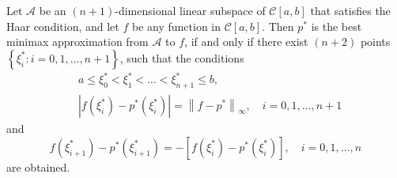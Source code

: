 \documentclass[11pt]{article}
\begin{document}
\begin{theorem} \label{thm:2}
Let $\mathscr{A}$ be an $(n+1)$-dimensional linear subspace of $\mathscr{C}[a, b]$ that satisfies the Haar condition, and let $f$ be any function in $\mathscr{C}[a, b]$. Then $p^{*}$ is the best minimax approximation from $\mathscr{A}$ to $f$, if and only if there exist $(n+2)$ points $\left\{\xi_{i}^{*}: i=0,1, \ldots, n+1\right\}$, such that the conditions
\begin{align}
& a \leqslant \xi_{0}^{*}<\xi_{1}^{*}<\ldots<\xi_{n+1}^{*} \leqslant b, \label{eq:6} \\
& \left|f\left(\xi_{i}^{*}\right)-p^{*}\left(\xi_{i}^{*}\right)\right|=\left\|f-p^{*}\right\|_{\infty}, \quad i=0,1, \ldots, n+1 \label{eq:7}
\end{align}
and
\begin{equation}
f\left(\xi_{i+1}^{*}\right)-p^{*}\left(\xi_{i+1}^{*}\right)=-\left[f\left(\xi_{i}^{*}\right)-p^{*}\left(\xi_{i}^{*}\right)\right], \quad i=0,1, \ldots, n \label{eq:8}
\end{equation}
are obtained.
\end{theorem}
\end{document}
